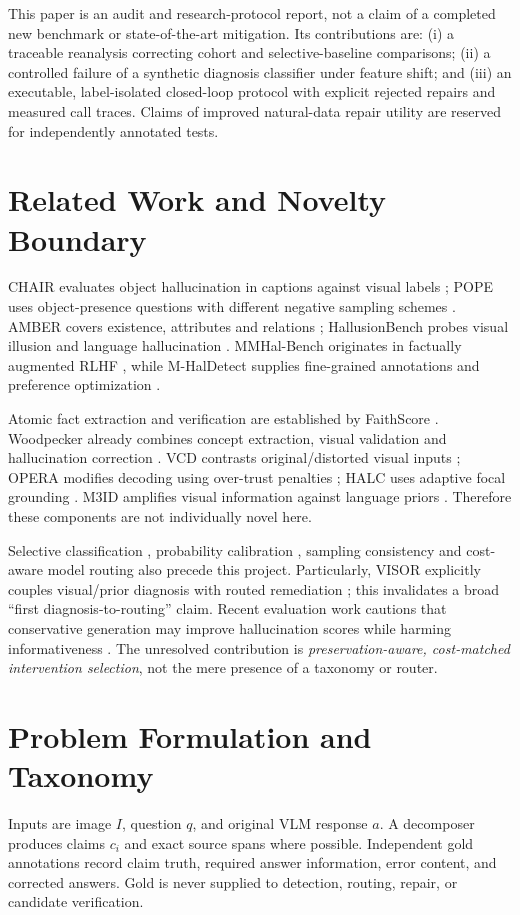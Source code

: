 \documentclass[conference]{IEEEtran}
\begin{document}
This paper is an audit and research-protocol report, not a claim of a completed
new benchmark or state-of-the-art mitigation. Its contributions are: (i) a
traceable reanalysis correcting cohort and selective-baseline comparisons;
(ii) a controlled failure of a synthetic diagnosis classifier under feature
shift; and (iii) an executable, label-isolated closed-loop protocol with
explicit rejected repairs and measured call traces. Claims of improved
natural-data repair utility are reserved for independently annotated tests.

\section{Related Work and Novelty Boundary}
CHAIR evaluates object hallucination in captions against visual labels
\cite{chair}; POPE uses object-presence questions with different negative
sampling schemes \cite{pope}. AMBER covers existence, attributes and relations
\cite{amber}; HallusionBench probes visual illusion and language hallucination
\cite{hallusion}. MMHal-Bench originates in factually augmented RLHF
\cite{rlhf}, while M-HalDetect supplies fine-grained annotations and preference
optimization \cite{mhal}.

Atomic fact extraction and verification are established by FaithScore
\cite{faith}. Woodpecker already combines concept extraction, visual validation
and hallucination correction \cite{wood}. VCD contrasts original/distorted
visual inputs \cite{vcd}; OPERA modifies decoding using over-trust penalties
\cite{opera}; HALC uses adaptive focal grounding \cite{halc}. M3ID amplifies
visual information against language priors \cite{m3id}. Therefore these
components are not individually novel here.

Selective classification \cite{selective}, probability calibration
\cite{calibration}, sampling consistency \cite{selfcheck} and cost-aware model
routing \cite{route} also precede this project. Particularly, VISOR explicitly
couples visual/prior diagnosis with routed remediation \cite{visor}; this
invalidates a broad ``first diagnosis-to-routing'' claim. Recent evaluation
work cautions that conservative generation may improve hallucination scores
while harming informativeness \cite{safe}. The unresolved contribution is
\emph{preservation-aware, cost-matched intervention selection}, not the mere
presence of a taxonomy or router.

\section{Problem Formulation and Taxonomy}
Inputs are image $I$, question $q$, and original VLM response $a$. A decomposer
produces claims $c_i$ and exact source spans where possible. Independent gold
annotations record claim truth, required answer information, error content,
and corrected answers. Gold is never supplied to detection, routing, repair,
or candidate verification.
\end{document}
